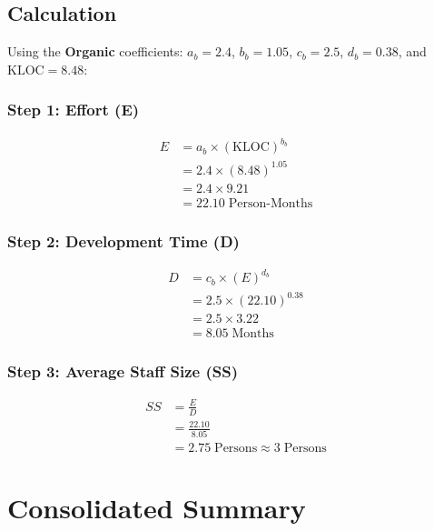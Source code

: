 \documentclass[11pt, a4paper]{article}
\begin{document}
\subsection{Calculation}

Using the \textbf{Organic} coefficients: $a_b = 2.4$, $b_b = 1.05$, $c_b = 2.5$, $d_b = 0.38$, and $\text{KLOC} = 8.48$:

\subsubsection{Step 1: Effort (E)}
\begin{align}
E &= a_b \times (\text{KLOC})^{b_b} \\[4pt]
  &= 2.4 \times (8.48)^{1.05} \\[4pt]
  &= 2.4 \times 9.21 \\[4pt]
  &= \boxed{22.10 \;\text{Person-Months}}
\end{align}

\subsubsection{Step 2: Development Time (D)}
\begin{align}
D &= c_b \times (E)^{d_b} \\[4pt]
  &= 2.5 \times (22.10)^{0.38} \\[4pt]
  &= 2.5 \times 3.22 \\[4pt]
  &= \boxed{8.05 \;\text{Months}}
\end{align}

\subsubsection{Step 3: Average Staff Size (SS)}
\begin{align}
SS &= \frac{E}{D} \\[4pt]
   &= \frac{22.10}{8.05} \\[4pt]
   &= \boxed{2.75 \;\text{Persons} \approx 3 \;\text{Persons}}
\end{align}

\newpage
\section{Consolidated Summary}
\end{document}
